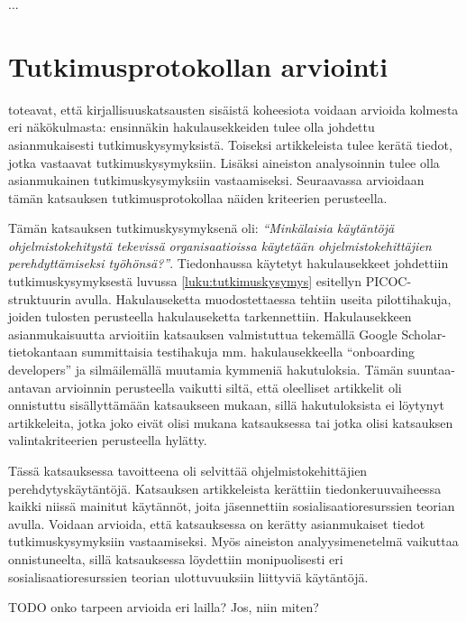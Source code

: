 \documentclass[utf8]{gradu3}
\begin{document}



...

\section{Tutkimusprotokollan arviointi}

\textcite{kitchenham-charters-2007} toteavat, että kirjallisuuskatsausten sisäistä koheesiota voidaan arvioida kolmesta eri näkökulmasta: ensinnäkin hakulausekkeiden tulee olla johdettu asianmukaisesti tutkimuskysymyksistä. Toiseksi artikkeleista tulee kerätä tiedot, jotka vastaavat tutkimuskysymyksiin. Lisäksi aineiston analysoinnin tulee olla asianmukainen tutkimuskysymyksiin vastaamiseksi. Seuraavassa arvioidaan tämän katsauksen tutkimusprotokollaa näiden kriteerien perusteella.

Tämän katsauksen tutkimuskysymyksenä oli: \textit{“Minkälaisia käytäntöjä ohjelmistokehitystä tekevissä organisaatioissa käytetään ohjelmistokehittäjien perehdyttämiseksi työhönsä?”}. Tiedonhaussa käytetyt hakulausekkeet johdettiin tutkimuskysymyksestä luvussa \ref{luku:tutkimuskysymys} esitellyn PICOC-struktuurin avulla. Hakulauseketta muodostettaessa tehtiin useita pilottihakuja, joiden tulosten perusteella hakulauseketta tarkennettiin. Hakulausekkeen asianmukaisuutta arvioitiin katsauksen valmistuttua tekemällä Google Scholar-tietokantaan summittaisia testihakuja mm. hakulausekkeella “onboarding developers” ja silmäilemällä muutamia kymmeniä hakutuloksia. Tämän suuntaa-antavan arvioinnin perusteella vaikutti siltä, että oleelliset artikkelit oli onnistuttu sisällyttämään katsaukseen mukaan, sillä hakutuloksista ei löytynyt artikkeleita, jotka joko eivät olisi mukana katsauksessa tai jotka olisi katsauksen valintakriteerien perusteella hylätty. 

Tässä katsauksessa tavoitteena oli selvittää ohjelmistokehittäjien perehdytyskäytäntöjä. Katsauksen artikkeleista kerättiin tiedonkeruuvaiheessa kaikki niissä mainitut käytännöt, joita jäsennettiin sosialisaatioresurssien teorian avulla. Voidaan arvioida, että katsauksessa on kerätty asianmukaiset tiedot tutkimuskysymyksiin vastaamiseksi. Myös aineiston analyysimenetelmä vaikuttaa onnistuneelta, sillä katsauksessa löydettiin monipuolisesti eri sosialisaatioresurssien teorian ulottuvuuksiin liittyviä käytäntöjä.

TODO onko tarpeen arvioida eri lailla? Jos, niin miten?




\printbibliography
\end{document}
